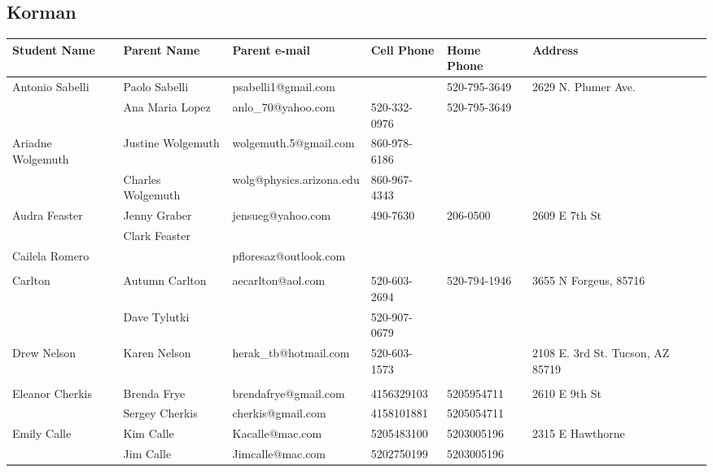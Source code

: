 \documentclass[landscape]{article}\usepackage[]{graphicx}\usepackage[]{color}
\begin{document}
\subsection{Korman}
\begin{longtable}{|p{100pt}|p{100pt}|p{140pt}|p{60pt}|p{64pt}|p{120pt}|}
\textbf{Student Name} & \textbf{Parent Name} & \textbf{Parent e-mail} & \textbf{Cell Phone} & \textbf{Home Phone} & \textbf{Address}\\
\hline
\hline
\multirow{2}{100pt}{Antonio Sabelli} & Paolo Sabelli & psabelli1@gmail.com &  & 520-795-3649 & \multirow{2}{120pt}{2629 N. Plumer Ave.} \\
 & Ana Maria Lopez & anlo\_70@yahoo.com & 520-332-0976 & 520-795-3649 & \\
\hline
\multirow{2}{100pt}{Ariadne Wolgemuth} & Justine Wolgemuth & wolgemuth.5@gmail.com & 860-978-6186 &  & \multirow{2}{120pt}{} \\
 & Charles Wolgemuth & wolg@physics.arizona.edu & 860-967-4343 &  & \\
\hline
\multirow{2}{100pt}{Audra Feaster} & Jenny Graber & jensueg@yahoo.com & 490-7630 & 206-0500 & \multirow{2}{120pt}{2609 E 7th St} \\
 & Clark Feaster &  &  &  & \\
\hline
\multirow{2}{100pt}{Cailela Romero} &  & pfloresaz@outlook.com &  &  & \multirow{2}{120pt}{} \\
 &  &  &  &  & \\
\hline
\multirow{2}{100pt}{Carlton} & Autumn Carlton & aecarlton@aol.com & 520-603-2694 & 520-794-1946 & \multirow{2}{120pt}{3655 N Forgeus, 85716} \\
 & Dave Tylutki &  & 520-907-0679 &  & \\
\hline
\multirow{2}{100pt}{Drew Nelson} & Karen Nelson & herak\_tb@hotmail.com & 520-603-1573 &  & \multirow{2}{120pt}{2108 E. 3rd St. Tucson, AZ 85719} \\
 &  &  &  &  & \\
\hline
\multirow{2}{100pt}{Eleanor Cherkis} & Brenda Frye & brendafrye@gmail.com & 4156329103 & 5205954711 & \multirow{2}{120pt}{2610 E 9th St} \\
 & Sergey Cherkis & cherkis@gmail.com & 4158101881 & 5205054711 & \\
\hline
\multirow{2}{100pt}{Emily Calle} & Kim Calle & Kacalle@mac.com & 5205483100 & 5203005196 & \multirow{2}{120pt}{2315 E Hawthorne} \\
 & Jim Calle & Jimcalle@mac.com & 5202750199 & 5203005196 & \\

\end{longtable}
\end{document}
